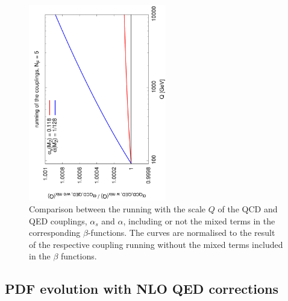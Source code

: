 \begin{figure}[h]
\includegraphics[width=6cm,angle=270]{figs/couplings.pdf} 
\caption{Comparison between the running with the scale
$Q$ of the QCD and QED couplings,
  $\alpha_s$ and $\alpha$, including or not the mixed terms in
  the corresponding $\beta$-functions.
%
  The curves are normalised to the result of the respective coupling
  running without the mixed terms included in the $\beta$ functions.}
\label{fig:CouplingEvol}
\end{figure}

\subsection{PDF evolution with NLO QED corrections}

